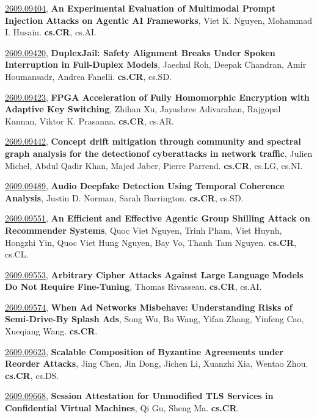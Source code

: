 \documentclass[9pt, a4paper]{article}
\theoremstyle{plain}
\theoremstyle{definition}
\theoremstyle{remark}
\newcommand{\arxivwithtarget}[3]{\hypertarget{#1}{}\href{https://arxiv.org/abs/#1}{#1}, \textbf{\textcolor{arxivblue}{#2}}, #3. }
\begin{document}
\arxivwithtarget{2609.09404}{An Experimental Evaluation of Multimodal Prompt Injection Attacks on Agentic AI Frameworks}{Viet K. Nguyen, Mohammad I. Husain}\textbf{cs.CR}, cs.AI.



\arxivwithtarget{2609.09420}{DuplexJail: Safety Alignment Breaks Under Spoken Interruption in Full-Duplex Models}{Jaechul Roh, Deepak Chandran, Amir Houmansadr, Andrea Fanelli}\textbf{cs.CR}, cs.SD.



\arxivwithtarget{2609.09423}{FPGA Acceleration of Fully Homomorphic Encryption with Adaptive Key Switching}{Zhihan Xu, Jayashree Adivarahan, Rajgopal Kannan, Viktor K. Prasanna}\textbf{cs.CR}, cs.AR.



\arxivwithtarget{2609.09442}{Concept drift mitigation through community and spectral graph analysis for the detectionof cyberattacks in network traffic}{Julien Michel, Abdul Qadir Khan, Majed Jaber, Pierre Parrend}\textbf{cs.CR}, cs.LG, cs.NI.



\arxivwithtarget{2609.09489}{Audio Deepfake Detection Using Temporal Coherence Analysis}{Justin D. Norman, Sarah Barrington}\textbf{cs.CR}, cs.SD.



\arxivwithtarget{2609.09551}{An Efficient and Effective Agentic Group Shilling Attack on Recommender Systems}{Quoc Viet Nguyen, Trinh Pham, Viet Huynh, Hongzhi Yin, Quoc Viet Hung Nguyen, Bay Vo, Thanh Tam Nguyen}\textbf{cs.CR}, cs.CL.



\arxivwithtarget{2609.09553}{Arbitrary Cipher Attacks Against Large Language Models Do Not Require Fine-Tuning}{Thomas Rivasseau}\textbf{cs.CR}, cs.AI.



\arxivwithtarget{2609.09574}{When Ad Networks Misbehave: Understanding Risks of Semi-Drive-By Splash Ads}{Song Wu, Bo Wang, Yifan Zhang, Yinfeng Cao, Xueqiang Wang}\textbf{cs.CR}.



\arxivwithtarget{2609.09623}{Scalable Composition of Byzantine Agreements under Reorder Attacks}{Jing Chen, Jin Dong, Jichen Li, Xuanzhi Xia, Wentao Zhou}\textbf{cs.CR}, cs.DS.



\arxivwithtarget{2609.09668}{Session Attestation for Unmodified TLS Services in Confidential Virtual Machines}{Qi Gu, Sheng Ma}\textbf{cs.CR}.
\end{document}
